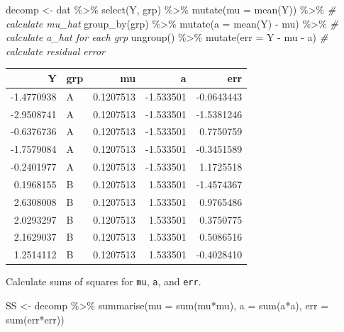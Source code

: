 \documentclass[
  oneside]{book}
\newenvironment{Shaded}{\begin{snugshade}}{\end{snugshade}}
\newcommand{\AttributeTok}[1]{\textcolor[rgb]{0.77,0.63,0.00}{#1}}
\newcommand{\CommentTok}[1]{\textcolor[rgb]{0.56,0.35,0.01}{\textit{#1}}}
\newcommand{\FunctionTok}[1]{\textcolor[rgb]{0.00,0.00,0.00}{#1}}
\newcommand{\NormalTok}[1]{#1}
\newcommand{\OtherTok}[1]{\textcolor[rgb]{0.56,0.35,0.01}{#1}}
\newcommand{\SpecialCharTok}[1]{\textcolor[rgb]{0.00,0.00,0.00}{#1}}
\begin{document}
\begin{Shaded}
\begin{Highlighting}[]
\NormalTok{decomp }\OtherTok{\textless{}{-}}\NormalTok{ dat }\SpecialCharTok{\%\textgreater{}\%} 
  \FunctionTok{select}\NormalTok{(Y, grp) }\SpecialCharTok{\%\textgreater{}\%}
  \FunctionTok{mutate}\NormalTok{(}\AttributeTok{mu =} \FunctionTok{mean}\NormalTok{(Y)) }\SpecialCharTok{\%\textgreater{}\%}     \CommentTok{\# calculate mu\_hat}
  \FunctionTok{group\_by}\NormalTok{(grp) }\SpecialCharTok{\%\textgreater{}\%}
  \FunctionTok{mutate}\NormalTok{(}\AttributeTok{a =} \FunctionTok{mean}\NormalTok{(Y) }\SpecialCharTok{{-}}\NormalTok{ mu) }\SpecialCharTok{\%\textgreater{}\%} \CommentTok{\# calculate a\_hat for each grp}
  \FunctionTok{ungroup}\NormalTok{() }\SpecialCharTok{\%\textgreater{}\%}
  \FunctionTok{mutate}\NormalTok{(}\AttributeTok{err =}\NormalTok{ Y }\SpecialCharTok{{-}}\NormalTok{ mu }\SpecialCharTok{{-}}\NormalTok{ a)     }\CommentTok{\# calculate residual error}
\end{Highlighting}
\end{Shaded}

\begin{tabular}{r|l|r|r|r}
\hline
Y & grp & mu & a & err\\
\hline
-1.4770938 & A & 0.1207513 & -1.533501 & -0.0643443\\
\hline
-2.9508741 & A & 0.1207513 & -1.533501 & -1.5381246\\
\hline
-0.6376736 & A & 0.1207513 & -1.533501 & 0.7750759\\
\hline
-1.7579084 & A & 0.1207513 & -1.533501 & -0.3451589\\
\hline
-0.2401977 & A & 0.1207513 & -1.533501 & 1.1725518\\
\hline
0.1968155 & B & 0.1207513 & 1.533501 & -1.4574367\\
\hline
2.6308008 & B & 0.1207513 & 1.533501 & 0.9765486\\
\hline
2.0293297 & B & 0.1207513 & 1.533501 & 0.3750775\\
\hline
2.1629037 & B & 0.1207513 & 1.533501 & 0.5086516\\
\hline
1.2514112 & B & 0.1207513 & 1.533501 & -0.4028410\\
\hline
\end{tabular}

Calculate sums of squares for \texttt{mu}, \texttt{a}, and \texttt{err}.

\begin{Shaded}
\begin{Highlighting}[]
\NormalTok{SS }\OtherTok{\textless{}{-}}\NormalTok{ decomp }\SpecialCharTok{\%\textgreater{}\%}
  \FunctionTok{summarise}\NormalTok{(}\AttributeTok{mu =} \FunctionTok{sum}\NormalTok{(mu}\SpecialCharTok{*}\NormalTok{mu),}
            \AttributeTok{a =} \FunctionTok{sum}\NormalTok{(a}\SpecialCharTok{*}\NormalTok{a),}
            \AttributeTok{err =} \FunctionTok{sum}\NormalTok{(err}\SpecialCharTok{*}\NormalTok{err))}
\end{Highlighting}
\end{Shaded}
\end{document}
